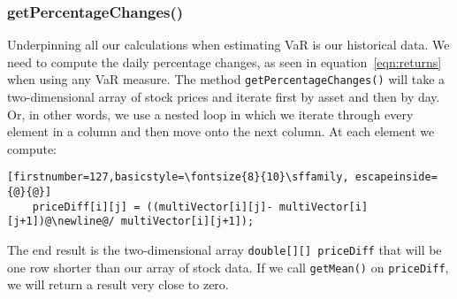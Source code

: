 \documentclass[../Dissertation.tex]{subfiles}
\begin{document}
\subsubsection{getPercentageChanges()}

Underpinning all our calculations when estimating VaR is our historical data.
We need to compute the daily percentage changes, as seen in equation~\ref{eqn:returns} when using any VaR measure.
The method \lstinline|getPercentageChanges()| will take a two-dimensional array of stock prices and iterate first by asset and then by day.
Or, in other words, we use a nested loop in which we iterate through every element in a column and then move onto the next column.
At each element we compute:
\begin{lstlisting}[firstnumber=127,basicstyle=\fontsize{8}{10}\sffamily, escapeinside={@}{@}]
	priceDiff[i][j] = ((multiVector[i][j]- multiVector[i][j+1])@\newline@/ multiVector[i][j+1]);
\end{lstlisting}
The end result is the two-dimensional array \lstinline|double[][] priceDiff| that will be one row shorter than our array of stock data.
If we call \lstinline|getMean()| on \lstinline|priceDiff|, we will return a result very close to zero.
\end{document}
